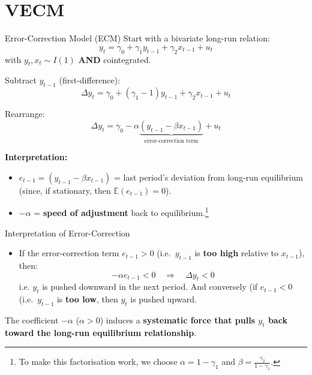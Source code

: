 \documentclass{beamer}
\begin{document}
\section{VECM}

\begin{frame}{Error-Correction Model (ECM)}
\small
Start with a bivariate long-run relation:
\[
y_t = \gamma_0 + \gamma_1 y_{t-1} + \gamma_2 x_{t-1} + u_t
\]
with $y_t, x_t \sim I(1)$ \textbf{AND} cointegrated.

Subtract $y_{t-1}$ (first-difference):
\[
\Delta y_t = \gamma_0 + (\gamma_1 - 1)y_{t-1} + \gamma_2 x_{t-1} + u_t
\]

Rearrange:
\[
\Delta y_t = \gamma_0 - \alpha \underbrace{(y_{t-1} - \beta x_{t-1})}_{\text{error-correction term}}
 + u_t
\]

\medskip
\textbf{Interpretation:}
\begin{itemize}
  \item $e_{t-1}=(y_{t-1} - \beta x_{t-1})$ = last period's deviation from long-run equilibrium (since, if stationary, then $\mathbb{E}(e_{t-1}) = 0$).
  \item $-\alpha$ = \textbf{speed of adjustment} back to equilibrium.\footnote{\footnotesize To make this factorisation work, we choose \(\alpha = 1 - \gamma_{1}\) and $\beta = \frac{\gamma_{2}}{1 - \gamma_{1}}$.}
\end{itemize}
\end{frame}

\begin{frame}{Interpretation of Error-Correction}
\small

\begin{itemize}


  \item If the error-correction term $e_{t-1} > 0$ (i.e.\ $y_{t-1}$ is \textbf{too high} relative to $x_{t-1}$), then:
  \[
  -\alpha e_{t-1} < 0 \quad \Rightarrow \quad \Delta y_t < 0
  \]
i.e.  $y_t$ is pushed downward in the next period. And conversely (if $e_{t-1} < 0$ (i.e.\ $y_{t-1}$ is \textbf{too low}, then $y_t$ is pushed upward.
\end{itemize}

\bigskip
The coefficient $-\alpha$ ($\alpha>0$) induces a  \textbf{systematic force that pulls $y_t$ back toward the long-run equilibrium relationship}.


\end{frame}
\end{document}
